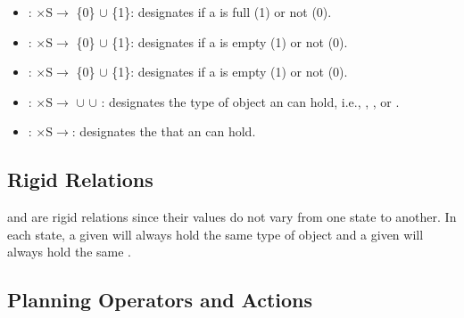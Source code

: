 \begin{itemize}
\item {}: $\mathrm{\times S\rightarrow}$ \{0\} $\cup$ \{1\}: designates if a  is full (1) or not (0).

\item {}: $\mathrm{\times S\rightarrow}$ \{0\} $\cup$ \{1\}: designates if a  is empty (1) or not (0).

\item {}: $\mathrm{\times S\rightarrow}$ \{0\} $\cup$ \{1\}: designates if a  is empty (1) or not (0).

\item {}: $\mathrm{\times S \rightarrow}$ $\cup$  $\cup$ : designates the type of object an  can hold, i.e., , , or .

\item {}: $\mathrm{\times S \rightarrow}$: designates the  that an  can hold.
\end{itemize}


\subsection{Rigid Relations}
\label{subsubsect:Rigid_Relation}
 and  are rigid relations since their values do not vary from one state to another. In each state, a given  will always hold the same type of object and a given  will always hold the same .

\subsection{Planning Operators and Actions}
\label{subsect:Planning_Operators}

